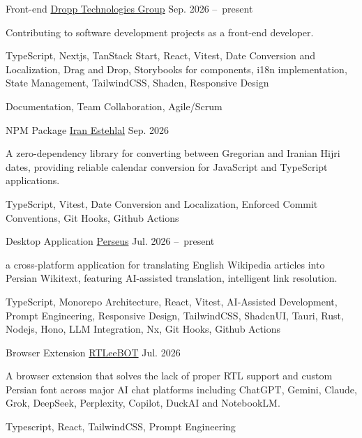 
\begin{cventries}

\cventry
{Front-end}
{\href{https://droppgroup.com}{Dropp Technologies Group}}
{} %
{Sep. 2026 --\ present}
{
	\begin{cvitems}
		\item {Contributing to software development projects as a front-end developer.}
    \item {TypeScript, Nextjs, TanStack Start, React, Vitest, Date Conversion and Localization, Drag and Drop, Storybooks for components, i18n implementation, State Management, TailwindCSS, Shadcn, Responsive Design}
		\item {Documentation, Team Collaboration, Agile/Scrum}
	\end{cvitems}
}

\cventry
{NPM Package}
{\href{https://www.npmjs.com/package/iran-estehlal}{Iran Estehlal}}
{}
{Sep. 2026}
{
  \begin{cvitems}
    \item {A zero-dependency library for converting between Gregorian and Iranian Hijri dates, providing reliable calendar conversion for JavaScript and TypeScript applications.}
    \item {TypeScript, Vitest, Date Conversion and Localization, Enforced Commit Conventions, Git Hooks, Github Actions}
  \end{cvitems}
}

\cventry
{Desktop Application}
{\href{https://github.com/wikimediairan/Perseus}{Perseus}}
{}
{Jul. 2026 --\ present}
{
  \begin{cvitems}
    \item {a cross-platform application for translating English Wikipedia articles into Persian Wikitext, featuring AI-assisted translation, intelligent link resolution.}
    \item {TypeScript, Monorepo Architecture, React, Vitest, AI‑Assisted Development, Prompt Engineering, Responsive Design, TailwindCSS, ShadcnUI, Tauri, Rust, Nodejs, Hono, LLM Integration, Nx, Git Hooks, Github Actions}
  \end{cvitems}
}

\cventry
{Browser Extension}
{\href{https://github.com/NedaMani/RTLeeBOT}{RTLeeBOT}}
{}
{Jul. 2026}
{
  \begin{cvitems}
    \item {A browser extension that solves the lack of proper RTL support and custom Persian font across major AI chat platforms including ChatGPT, Gemini, Claude, Grok, DeepSeek, Perplexity, Copilot, DuckAI and NotebookLM.}
    \item {Typescript, React, TailwindCSS, Prompt Engineering}
  \end{cvitems}
}


\end{cventries}
